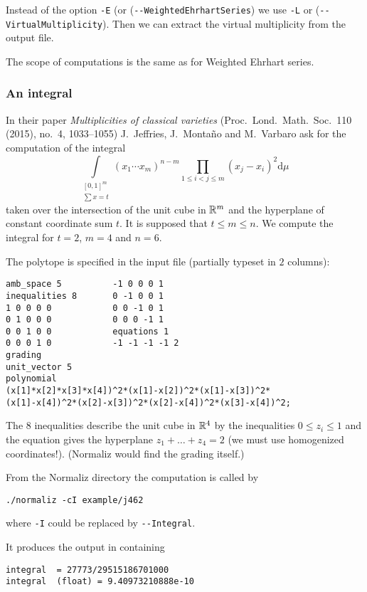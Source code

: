 Instead of the option \verb|-E| (or (\verb|--WeightedEhrhartSeries|) we use \verb|-L| or (\verb|--VirtualMultiplicity|). Then we can extract the virtual multiplicity from the output file.

The scope of computations is the same as for Weighted Ehrhart series.

\subsubsection{An integral}
In their paper \emph{Multiplicities of classical varieties} (Proc.\ Lond.\ Math.\ Soc.\ 110 (2015), no.~4, 1033--1055) J.~Jeffries, J.~Monta\~no and M.~Varbaro ask
for the computation of the integral
$$
\int\limits_{\substack{[0,1]^m \\ \sum{x}= t}}(x_1\cdots x_{m})^{n-m}\prod_{1\le i<j \le m}(x_j-x_i)^2 \mathrm d{\mu}\
$$
taken over the intersection of the unit cube in ${\mathbb R}^m$ and the hyperplane of constant coordinate sum $t$. It is supposed that $t\le m \le n$. We compute the integral for $t=2$, $m=4$ and $n=6$.

The polytope is specified in the input file  (partially typeset in $2$
columns):

\begin{Verbatim}
amb_space 5          -1 0 0 0 1   
inequalities 8       0 -1 0 0 1   
1 0 0 0 0            0 0 -1 0 1   
0 1 0 0 0            0 0 0 -1 1   
0 0 1 0 0            equations 1  
0 0 0 1 0            -1 -1 -1 -1 2
grading
unit_vector 5
polynomial
(x[1]*x[2]*x[3]*x[4])^2*(x[1]-x[2])^2*(x[1]-x[3])^2*
(x[1]-x[4])^2*(x[2]-x[3])^2*(x[2]-x[4])^2*(x[3]-x[4])^2;
\end{Verbatim}

The $8$ inequalities describe the unit cube in ${\mathbb R}^4$ by the inequalities $0\le z_i\le 1$
and the equation gives the hyperplane $z_1+\dots+z_4=2$ (we must use homogenized coordinates!). (Normaliz would find the grading itself.)

From the Normaliz directory the computation is called by

\begin{Verbatim}
./normaliz -cI example/j462
\end{Verbatim}
where \verb|-I| could be replaced by \verb|--Integral|.

It produces the output in  containing

\begin{Verbatim}
integral  = 27773/29515186701000
integral  (float) = 9.40973210888e-10
\end{Verbatim}

